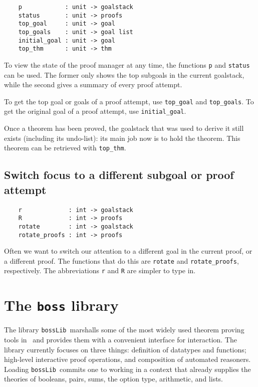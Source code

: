 \begin{verbatim}
    p            : unit -> goalstack
    status       : unit -> proofs
    top_goal     : unit -> goal
    top_goals    : unit -> goal list
    initial_goal : unit -> goal
    top_thm      : unit -> thm
\end{verbatim}

To view the state of the proof manager at any time, the functions
\verb+p+ and \verb+status+ can be used. The former only shows
the top subgoals in the current goalstack, while the second gives a
summary of every proof attempt.

To get the top goal or goals of a proof attempt, use \verb+top_goal+
and \verb+top_goals+. To get the original goal of a proof attempt,
use \verb+initial_goal+.

Once a theorem has been proved, the goalstack that was used to derive it
still exists (including its undo-list): its main job now is to
hold the theorem. This theorem can be retrieved with
\verb+top_thm+.

\subsection{Switch focus to a different subgoal or proof attempt}

\begin{verbatim}
    r             : int -> goalstack
    R             : int -> proofs
    rotate        : int -> goalstack
    rotate_proofs : int -> proofs
\end{verbatim}

Often we want to switch our attention to a different goal in the current
proof, or a different proof. The functions that do this are
\verb+rotate+ and \verb+rotate_proofs+, respectively. The abbreviations
\verb+r+ and \verb+R+ are simpler to type in.
\section{The {\tt boss} library}
\label{sec:bossLib}
\newcommand\bossLib{{\tt bossLib}}

The library \bossLib\ marshalls some of the most widely used theorem
proving tools in \HOL\ and provides them with a convenient interface
for interaction. The library currently focuses on three things:
definition of datatypes and functions; high-level interactive proof
operations, and composition of automated reasoners. Loading \bossLib\
commits one to working in a context that already supplies the theories
of booleans, pairs, sums, the option type, arithmetic, and lists.

